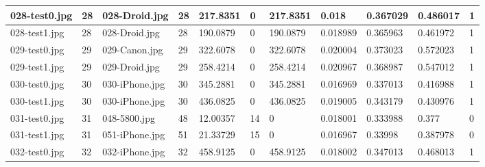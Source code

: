 \begin{landscape}
\begin{longtable}{|p{2cm}|p{1cm}|p{2cm}|p{1cm}|p{2cm}|p{1cm}|p{2cm}|p{2cm}|p{2cm}|p{2cm}|p{1cm}|}
	028-test0.jpg   & 28               & 028-Droid.jpg         & 28                          & 217.8351              & 0                       & 217.8351                   & 0.018                 & 0.367029              & 0.486017                 & 1                \\ \hline
	028-test1.jpg   & 28               & 028-Droid.jpg         & 28                          & 190.0879              & 0                       & 190.0879                   & 0.018989              & 0.365963              & 0.461972                 & 1                \\ \hline
	029-test0.jpg   & 29               & 029-Canon.jpg         & 29                          & 322.6078              & 0                       & 322.6078                   & 0.020004              & 0.373023              & 0.572023                 & 1                \\ \hline
	029-test1.jpg   & 29               & 029-Droid.jpg         & 29                          & 258.4214              & 0                       & 258.4214                   & 0.020967              & 0.368987              & 0.547012                 & 1                \\ \hline
	030-test0.jpg   & 30               & 030-iPhone.jpg        & 30                          & 345.2881              & 0                       & 345.2881                   & 0.016969              & 0.337013              & 0.416988                 & 1                \\ \hline
	030-test1.jpg   & 30               & 030-iPhone.jpg        & 30                          & 436.0825              & 0                       & 436.0825                   & 0.019005              & 0.343179              & 0.430976                 & 1                \\ \hline
	031-test0.jpg   & 31               & 048-5800.jpg          & 48                          & 12.00357              & 14                      & 0                          & 0.018001              & 0.333988              & 0.377                    & 0                \\ \hline
	031-test1.jpg   & 31               & 051-iPhone.jpg        & 51                          & 21.33729              & 15                      & 0                          & 0.016967              & 0.33998               & 0.387978                 & 0                \\ \hline
	032-test0.jpg   & 32               & 032-iPhone.jpg        & 32                          & 458.9125              & 0                       & 458.9125                   & 0.018002              & 0.347013              & 0.468013                 & 1                \\ \hline

\end{longtable}
\end{landscape}
